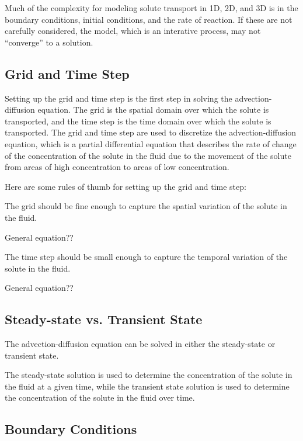 \documentclass{tufte-handout}\usepackage[]{graphicx}\usepackage[]{xcolor}
\newenvironment{itemize*}%
  {\begin{itemize}%
    \setlength{\itemsep}{0pt}%
    \setlength{\parskip}{0pt}}%
  {\end{itemize}}
\begin{document}
Much of the complexity for modeling solute transport in 1D, 2D, and 3D is in the boundary conditions, initial conditions, and the rate of reaction. If these are not carefully considered, the model, which is an interative process, may not ``converge'' to a solution.

\subsection{Grid and Time Step}

Setting up the grid and time step is the first step in solving the advection-diffusion equation. The grid is the spatial domain over which the solute is transported, and the time step is the time domain over which the solute is transported. The grid and time step are used to discretize the advection-diffusion equation, which is a partial differential equation that describes the rate of change of the concentration of the solute in the fluid due to the movement of the solute from areas of high concentration to areas of low concentration.

Here are some rules of thumb for setting up the grid and time step:

\begin{itemize*}
\item The grid should be fine enough to capture the spatial variation of the solute in the fluid.

\noindent General equation??

\item The time step should be small enough to capture the temporal variation of the solute in the fluid.

\noindent General equation??

\end{itemize*}



\subsection{Steady-state vs. Transient State}

The advection-diffusion equation can be solved in either the steady-state or transient state. 

The steady-state solution is used to determine the concentration of the solute in the fluid at a given time, while the transient state solution is used to determine the concentration of the solute in the fluid over time.

\subsection{Boundary Conditions}
\end{document}
